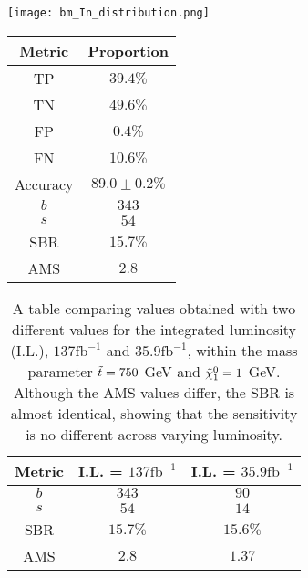 \noindent\begin{minipage}{\textwidth}
  \centering
  \begin{minipage}[htbp]{0.6\textwidth}
    \centering
    \texttt{[image: bm\_In\_distribution.png]}
    \label{fig:dist_bm_in}
  \end{minipage}
  \hfill
  \begin{minipage}[htbp]{0.39\textwidth}
        \centering
        \begin{tabular}{c|c} 
        \toprule
        Metric & Proportion \\
        \midrule
        \rowcolor{gray!6} TP & $39.4 \%$ \\
        TN & $49.6 \%$ \\
        \rowcolor{gray!6} FP & $0.4 \%$\\
        FN & $10.6 \%$ \\
        \rowcolor{gray!6} Accuracy & $89.0 \pm 0.2 \%$ \\
        \midrule
        $b$ & $343$ \\
        \rowcolor{gray!6} $s$ & $54$ \\
        SBR & $15.7\%$\\
        \rowcolor{gray!6} AMS & $2.8$ \\
        \bottomrule
        \end{tabular}
        \label{tab:Values_in}
    \end{minipage}
\end{minipage}
\hfill\break

\begin{table}[htbp]
    \centering
    \begin{tabular}{c||c|c}
        \toprule
        Metric & I.L. = $137\text{fb}^{-1}$ & I.L. = $35.9\text{fb}^{-1}$ \\
        \midrule
        \rowcolor{gray!6} $b$ & $343$ & $90$ \\
        $s$ & $54$ & $14$\\
        \rowcolor{gray!6} SBR & $15.7\%$ & $15.6\%$\\
        AMS & $2.8$ & $1.37$ \\
        \bottomrule
    \end{tabular}
    \caption{A table comparing values obtained with two different values for the integrated luminosity (I.L.), $137\text{fb}^{-1}$ and $35.9\text{fb}^{-1}$, within the mass parameter $\Tilde{t} = 750$ GeV and $\Tilde{\chi}_1^0 = 1$ GeV. Although the AMS values differ, the SBR is almost identical, showing that the sensitivity is no different across varying luminosity.}
    \label{tab:valsComp}
\end{table}
\hfill\break

